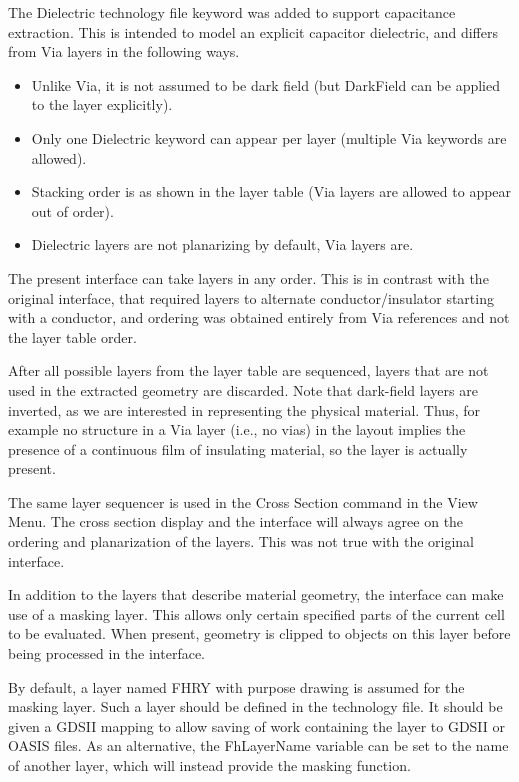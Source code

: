 The {\et Dielectric} technology file keyword was added to support
capacitance extraction.  This is intended to model an explicit
capacitor dielectric, and differs from {\et Via} layers in the
following ways.

\begin{itemize}
\item{Unlike {\et Via}, it is not assumed to be dark field (but {\et
DarkField} can be applied to the layer explicitly).}

\item{Only one {\et Dielectric} keyword can appear per layer (multiple
{\et Via} keywords are allowed).}

\item{Stacking order is as shown in the layer table ({\et Via} layers
are allowed to appear out of order).}

\item{{\et Dielectric} layers are not planarizing by default, {\et
Via} layers are.}
\end{itemize}

The present interface can take layers in any order.  This is in
contrast with the original interface, that required layers to
alternate conductor/insulator starting with a conductor, and ordering
was obtained entirely from {\et Via} references and not the layer
table order.

After all possible layers from the layer table are sequenced, layers
that are not used in the extracted geometry are discarded.  Note that
dark-field layers are inverted, as we are interested in representing
the physical material.  Thus, for example no structure in a {\et Via}
layer (i.e., no vias) in the layout implies the presence of a
continuous film of insulating material, so the layer is actually
present.

The same layer sequencer is used in the {\cb Cross Section} command in
the {\cb View Menu}.  The cross section display and the interface will
always agree on the ordering and planarization of the layers.  This
was not true with the original interface.

In addition to the layers that describe material geometry, the
interface can make use of a masking layer.  This allows only certain
specified parts of the current cell to be evaluated.  When present,
geometry is clipped to objects on this layer before being processed in
the interface.

By default, a layer named {\vt FHRY} with purpose {\vt drawing} is
assumed for the masking layer.  Such a layer should be defined in the
technology file.  It should be given a GDSII mapping to allow saving
of work containing the layer to GDSII or OASIS files.  As an
alternative, the {\et FhLayerName} variable can be set to the name of
another layer, which will instead provide the masking function.

